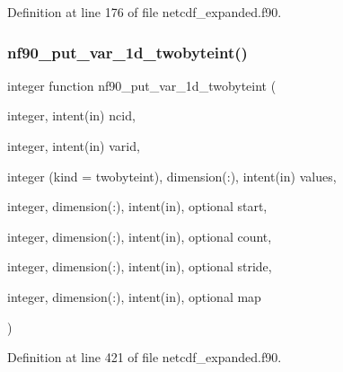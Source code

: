 Definition at line 176 of file netcdf\+\_\+expanded.\+f90.

\mbox{\label{netcdf__expanded_8f90_a1a3b442e85f4db624d373f829961133a}} 
\subsubsection{\texorpdfstring{nf90\+\_\+put\+\_\+var\+\_\+1d\+\_\+twobyteint()}{nf90\_put\_var\_1d\_twobyteint()}}
{\footnotesize\ttfamily integer function nf90\+\_\+put\+\_\+var\+\_\+1d\+\_\+twobyteint (\begin{DoxyParamCaption}\item[{integer, intent(in)}]{ncid,  }\item[{integer, intent(in)}]{varid,  }\item[{integer (kind = twobyteint), dimension(\+:), intent(in)}]{values,  }\item[{integer, dimension(\+:), intent(in), optional}]{start,  }\item[{integer, dimension(\+:), intent(in), optional}]{count,  }\item[{integer, dimension(\+:), intent(in), optional}]{stride,  }\item[{integer, dimension(\+:), intent(in), optional}]{map }\end{DoxyParamCaption})}



Definition at line 421 of file netcdf\+\_\+expanded.\+f90.

\mbox{\label{netcdf__expanded_8f90_a2a4dd99b7f94ec3567a026e9dc1e890b}} 
